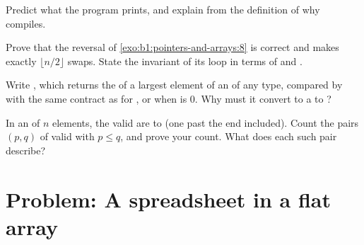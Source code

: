 \begin{exercise}[$\star\star$]\label{exo:b1:pointers-and-arrays:9}
Predict what the program prints, and explain from the definition of  why  compiles.
\end{exercise}

\begin{exercise}[$\star\star\star$]\label{exo:b1:pointers-and-arrays:10}
Prove that the  reversal of \cref{exo:b1:pointers-and-arrays:8} is correct and makes exactly
$\lfloor n/2 \rfloor$ swaps. State the invariant of its loop in terms of  and .
\end{exercise}

\begin{exercise}[$\star\star\star$]\label{exo:b1:pointers-and-arrays:11}
Write , which
returns the  of a largest element of an  of any type, compared by  with the same contract as
for , or  when  is 0. Why must it convert  to a  to ?
\end{exercise}

\begin{exercise}[$\star\star\star$]\label{exo:b1:pointers-and-arrays:12}
In an  of $n$ elements, the valid  are  to  (one past the end included). Count
the pairs $(p, q)$ of valid  with $p \leq q$, and prove your count. What does each such pair describe?
\end{exercise}

\section{Problem: A spreadsheet in a flat array}\label{sec:b1:pointers-and-arrays:problem}

